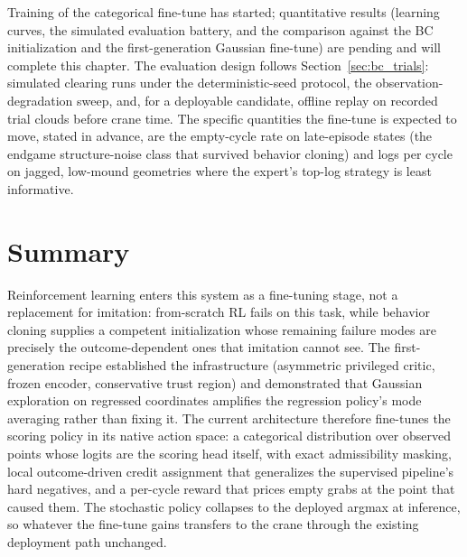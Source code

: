 Training of the categorical fine-tune has started; quantitative results
(learning curves, the simulated evaluation battery, and the comparison
against the BC initialization and the first-generation Gaussian fine-tune)
are pending and will complete this chapter. The evaluation design follows
Section~\ref{sec:bc_trials}: simulated clearing runs under the
deterministic-seed protocol, the observation-degradation sweep, and, for a
deployable candidate, offline replay on recorded trial clouds before crane
time. The specific quantities the fine-tune is expected to move, stated in
advance, are the empty-cycle rate on late-episode states (the endgame
structure-noise class that survived behavior cloning) and logs per cycle on
jagged, low-mound geometries where the expert's top-log strategy is least
informative.

\section{Summary}

Reinforcement learning enters this system as a fine-tuning stage, not a
replacement for imitation: from-scratch RL fails on this task, while
behavior cloning supplies a competent initialization whose remaining failure
modes are precisely the outcome-dependent ones that imitation cannot see.
The first-generation recipe established the infrastructure (asymmetric
privileged critic, frozen encoder, conservative trust region) and
demonstrated that Gaussian exploration on regressed coordinates amplifies
the regression policy's mode averaging rather than fixing it. The current
architecture therefore fine-tunes the scoring policy in its native action
space: a categorical distribution over observed points whose logits are the
scoring head itself, with exact admissibility masking, local outcome-driven
credit assignment that generalizes the supervised pipeline's hard negatives,
and a per-cycle reward that prices empty grabs at the point that caused
them. The stochastic policy collapses to the deployed argmax at inference,
so whatever the fine-tune gains transfers to the crane through the existing
deployment path unchanged.
